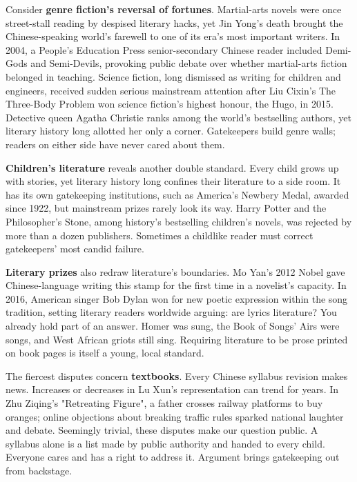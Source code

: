 Consider \textbf{genre fiction's reversal of fortunes}. Martial-arts novels were once street-stall reading by despised literary hacks, yet Jin Yong's death brought the Chinese-speaking world's farewell to one of its era's most important writers. In 2004, a People's Education Press senior-secondary Chinese reader included Demi-Gods and Semi-Devils, provoking public debate over whether martial-arts fiction belonged in teaching. Science fiction, long dismissed as writing for children and engineers, received sudden serious mainstream attention after Liu Cixin's The Three-Body Problem won science fiction's highest honour, the Hugo, in 2015. Detective queen Agatha Christie ranks among the world's bestselling authors, yet literary history long allotted her only a corner. Gatekeepers build genre walls; readers on either side have never cared about them.

\textbf{Children's literature} reveals another double standard. Every child grows up with stories, yet literary history long confines their literature to a side room. It has its own gatekeeping institutions, such as America's Newbery Medal, awarded since 1922, but mainstream prizes rarely look its way. Harry Potter and the Philosopher's Stone, among history's bestselling children's novels, was rejected by more than a dozen publishers. Sometimes a childlike reader must correct gatekeepers' most candid failure.

\textbf{Literary prizes} also redraw literature's boundaries. Mo Yan's 2012 Nobel gave Chinese-language writing this stamp for the first time in a novelist's capacity. In 2016, American singer Bob Dylan won for new poetic expression within the song tradition, setting literary readers worldwide arguing: are lyrics literature? You already hold part of an answer. Homer was sung, the Book of Songs' Airs were songs, and West African griots still sing. Requiring literature to be prose printed on book pages is itself a young, local standard.

The fiercest disputes concern \textbf{textbooks}. Every Chinese syllabus revision makes news. Increases or decreases in Lu Xun's representation can trend for years. In Zhu Ziqing's "Retreating Figure", a father crosses railway platforms to buy oranges; online objections about breaking traffic rules sparked national laughter and debate. Seemingly trivial, these disputes make our question public. A syllabus alone is a list made by public authority and handed to every child. Everyone cares and has a right to address it. Argument brings gatekeeping out from backstage.

